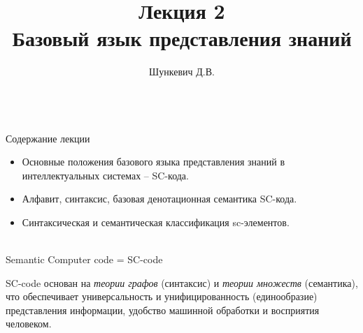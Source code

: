 \title{Лекция 2\\Базовый язык представления знаний}   
\author[]{Шункевич Д.В.}

\begin{frame}
	\titlepage
\end{frame}

\begin{frame}{\\Содержание лекции}
	\topline
	\justifying
	\begin{itemize}
	\item Основные положения базового языка представления знаний в интеллектуальных системах – SC-кода. 
	\item Алфавит, синтаксис, базовая денотационная семантика SC-кода. 
	\item Синтаксическая и семантическая классификация sc-элементов.
	\end{itemize}
\end{frame}

\begin{frame}{\\Semantic Computer code = SC-code}
	\vspace{10mm}
	\begin{SCn}
	\vspace{5mm}
	SC-code основан на \textit{теории графов} (синтаксис) и \textit{теории множеств} (семантика), что обеспечивает универсальность и унифицированность (единообразие) представления информации, удобство машинной обработки и восприятия человеком.
	\end{SCn}
\end{frame}

